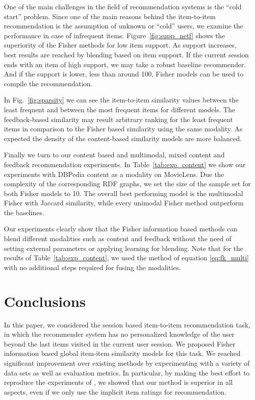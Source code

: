 One of the main challenges in the field of recommendation systems is the ``cold start'' problem. Since one of the main reasons behind the item-to-item 
recommendation is the assumption of unknown or ``cold'' users, we examine the performance in case of infrequent items. Figure~\ref{fig:supp_netf} shows the superiority of the Fisher methods for
low item support.  As support increases, best results are reached by blending based on item support.  If the current session ends with an item of high support, we may take a robust baseline recommender.  And if the support is lower, less than around 100, Fisher models can be used to compile the recommendation.

In Fig.~\ref{fig:sparsity} we can see the item-to-item similarity values between the least frequent and between the most frequent items for different models. The feedback-based similarity may result arbitrary 
ranking for the least frequent items in comparison to the Fisher based similarity using the same modality. As expected the density of the content-based similarity models are more balanced. 

Finally we turn to our content based and multimodal, mixed content and feedback recommendation experiments.
In Table~\ref{tab:exp_content} we show our experiments with DBPedia content as a modality on MovieLens. Due the complexity of the corresponding RDF graphs, we set the size of the sample set for both Fisher models to 10. 
The overall best performing model is the multimodal Fisher with Jaccard similarity, while every unimodal Fisher method outperform the baselines. 

Our experiments clearly show that the Fisher information based methods can blend different modalities such as content and feedback without the need of setting external parameters or applying learning for blending.  Note that for the results of Table~\ref{tab:exp_content}, we used the method of equation \eqref{eq:fk_multi} with no additional steps required for fusing the modalities.

\section{Conclusions}

In this paper, we considered the session based item-to-item recommendation task, in which the recommender system has no personalized knowledge of the user beyond the last items visited in the current user session.
We proposed Fisher information based global item-item similarity models for this task.
We reached significant improvement over existing methods by experimenting with a variety of data sets as well as evaluation metrics. In particular, by making the best effort to 
reproduce the experiments of \cite{koenigstein2013towards}, we showed that our method is superior in all aspects, even if we only use the implicit item ratings for recommendation.


